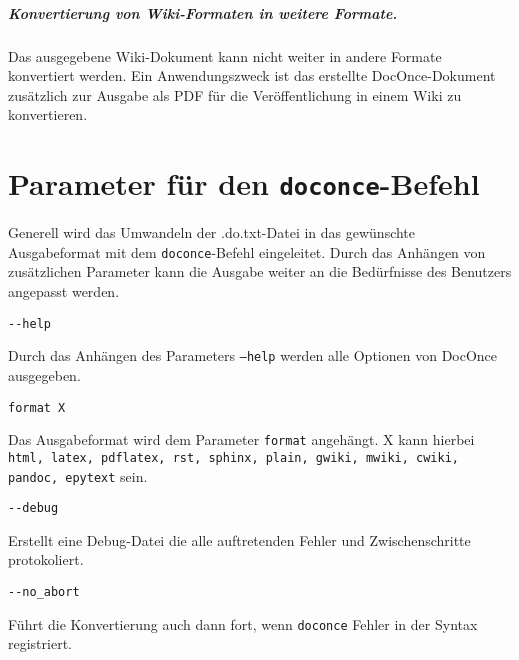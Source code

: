 \documentclass[%
oneside,                 %
final,                   %
chapterprefix=true,      %
open=right,              %
10pt]{book}
\begin{document}
\paragraph{ Konvertierung von Wiki-Formaten in weitere Formate.}
Das ausgegebene Wiki-Dokument kann nicht weiter in andere Formate konvertiert werden. Ein Anwendungszweck ist das erstellte DocOnce-Dokument zusätzlich zur Ausgabe als PDF für die Veröffentlichung in einem Wiki zu konvertieren.
\chapter{Parameter für den \texttt{doconce}-Befehl}
Generell wird das Umwandeln der \*.do.txt-Datei in das gewünschte Ausgabeformat mit dem \texttt{doconce}-Befehl eingeleitet. Durch das Anhängen von zusätzlichen Parameter kann die Ausgabe weiter an die Bedürfnisse des Benutzers angepasst werden.

\begin{verbatim}
--help
\end{verbatim}

Durch das Anhängen des Parameters \texttt{--help} werden alle Optionen von DocOnce ausgegeben.

\begin{verbatim}
format X
\end{verbatim}

Das Ausgabeformat wird dem Parameter \texttt{format} angehängt. X kann hierbei \texttt{html, latex, pdflatex, rst, sphinx, plain, gwiki, mwiki, cwiki, pandoc, epytext} sein.

\begin{verbatim}
--debug
\end{verbatim}

Erstellt eine Debug-Datei die alle auftretenden Fehler und Zwischenschritte protokoliert.

\begin{verbatim}
--no_abort
\end{verbatim}

Führt die Konvertierung auch dann fort, wenn \texttt{doconce} Fehler in der Syntax registriert.
\end{document}
